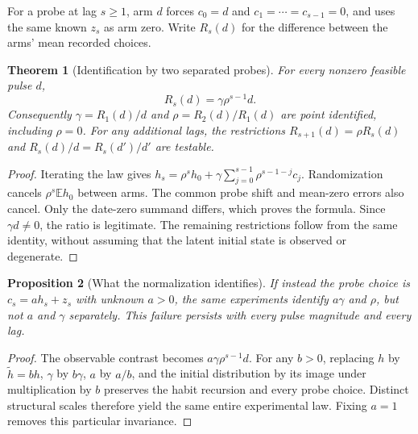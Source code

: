 \documentclass[11pt]{article}
\newtheorem{theorem}{Theorem}
\newtheorem{proposition}[theorem]{Proposition}
\theoremstyle{definition}
\begin{document}
For a probe at lag $s\ge1$, arm $d$ forces $c_0=d$ and
$c_1=\cdots=c_{s-1}=0$, and uses the same known $z_s$ as arm zero.
Write $R_s(d)$ for the difference between the arms' mean recorded choices.
\begin{theorem}[Identification by two separated probes]
For every nonzero feasible pulse $d$,
\[
 R_s(d)=\gamma\rho^{s-1}d.
\]
Consequently $\gamma=R_1(d)/d$ and
$\rho=R_2(d)/R_1(d)$ are point identified, including $\rho=0$.
For any additional lags, the restrictions
$R_{s+1}(d)=\rho R_s(d)$ and $R_s(d)/d=R_s(d')/d'$ are testable.
\end{theorem}
\begin{proof}
Iterating the law gives
$h_s=\rho^s h_0+\gamma\sum_{j=0}^{s-1}\rho^{s-1-j}c_j$.
Randomization cancels $\rho^s\mathbb E h_0$ between arms. The common probe
shift and mean-zero errors also cancel. Only the date-zero summand differs,
which proves the formula. Since $\gamma d\ne0$, the ratio is legitimate.
The remaining restrictions follow from the same identity, without assuming
that the latent initial state is observed or degenerate.
\end{proof}

\begin{proposition}[What the normalization identifies]
If instead the probe choice is $c_s=a h_s+z_s$ with unknown $a>0$, the same
experiments identify $a\gamma$ and $\rho$, but not $a$ and $\gamma$ separately.
This failure persists with every pulse magnitude and every lag.
\end{proposition}
\begin{proof}
The observable contrast becomes $a\gamma\rho^{s-1}d$.
For any $b>0$, replacing $h$ by $\widetilde h=bh$,
$\gamma$ by $b\gamma$, $a$ by $a/b$, and the initial distribution by its
image under multiplication by $b$ preserves the habit recursion and every
probe choice. Distinct structural scales therefore yield the same entire
experimental law. Fixing $a=1$ removes this particular invariance.
\end{proof}
\end{document}
